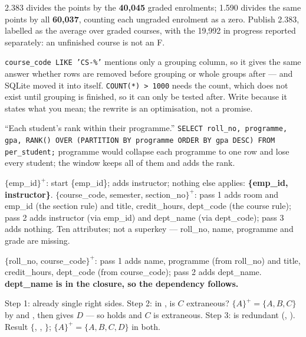 \begin{ans}
  \item 2.383 divides the points by the \textbf{40{,}045} graded enrolments;
        1.590 divides the same points by all \textbf{60{,}037}, counting each
        ungraded enrolment as a zero. Publish 2.383, labelled as the average
        over graded courses, with the 19{,}992 in progress reported separately:
        an unfinished course is not an F.
  \item \texttt{course\_code LIKE 'CS-\%'} mentions only a grouping column, so
        it gives the same answer whether rows are removed before grouping or
        whole groups after --- and SQLite moved it into  itself.
        \texttt{COUNT(*) > 1000} needs the count, which does not exist until
        grouping is finished, so it can only be tested after. Write
         because it states what you mean; the rewrite is an
        optimisation, not a promise.
  \item ``Each student's rank within their programme.''
        \texttt{SELECT roll\_no, programme, gpa, RANK() OVER (PARTITION BY
        programme ORDER BY gpa DESC) FROM per\_student;} 
        programme would collapse each programme to one row and lose every
        student; the window keeps all of them and adds the rank.
\end{ans}

\begin{ans}
  \item $\{$emp\_id$\}^{+}$: start \{emp\_id\};  adds
        instructor; nothing else applies: \textbf{\{emp\_id, instructor\}}.
        $\{$course\_code, semester, section\_no$\}^{+}$: pass 1 adds room and
        emp\_id (the section rule) and title, credit\_hours, dept\_code (the
        course rule); pass 2 adds instructor (via emp\_id) and dept\_name (via
        dept\_code); pass 3 adds nothing. Ten attributes; not a superkey ---
        roll\_no, name, programme and grade are missing.
  \item $\{$roll\_no, course\_code$\}^{+}$: pass 1 adds name, programme (from
        roll\_no) and title, credit\_hours, dept\_code (from course\_code);
        pass 2 adds dept\_name. \textbf{dept\_name is in the closure, so the
        dependency follows.}
  \item Step 1: already single right sides. Step 2: in , is $C$
        extraneous? $\{A\}^{+} = \{A, B, C\}$ by  and , then
         gives $D$ --- so  holds and $C$ is extraneous.
        Step 3:  is redundant (, ). Result
        $\{$, , $\}$; $\{A\}^{+} = \{A,B,C,D\}$ in
        both.
\end{ans}

